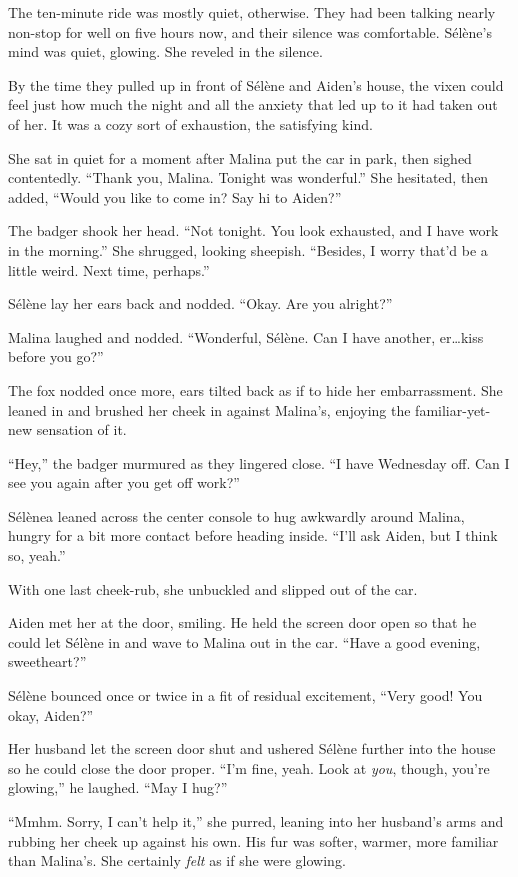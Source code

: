 The ten-minute ride was mostly quiet, otherwise. They had been talking nearly non-stop for well on five hours now, and their silence was comfortable. Sélène's mind was quiet, glowing. She reveled in the silence.

By the time they pulled up in front of Sélène and Aiden's house, the vixen could feel just how much the night and all the anxiety that led up to it had taken out of her. It was a cozy sort of exhaustion, the satisfying kind.

She sat in quiet for a moment after Malina put the car in park, then sighed contentedly. ``Thank you, Malina. Tonight was wonderful.'' She hesitated, then added, ``Would you like to come in? Say hi to Aiden?''

The badger shook her head. ``Not tonight. You look exhausted, and I have work in the morning.'' She shrugged, looking sheepish. ``Besides, I worry that'd be a little weird. Next time, perhaps.''

Sélène lay her ears back and nodded. ``Okay. Are you alright?''

Malina laughed and nodded. ``Wonderful, Sélène. Can I have another, er\ldots{}kiss before you go?''

The fox nodded once more, ears tilted back as if to hide her embarrassment. She leaned in and brushed her cheek in against Malina's, enjoying the familiar-yet-new sensation of it.

``Hey,'' the badger murmured as they lingered close. ``I have Wednesday off. Can I see you again after you get off work?''

Sélènea leaned across the center console to hug awkwardly around Malina, hungry for a bit more contact before heading inside. ``I'll ask Aiden, but I think so, yeah.''

With one last cheek-rub, she unbuckled and slipped out of the car.

Aiden met her at the door, smiling. He held the screen door open so that he could let Sélène in and wave to Malina out in the car. ``Have a good evening, sweetheart?''

Sélène bounced once or twice in a fit of residual excitement, ``Very good! You okay, Aiden?''

Her husband let the screen door shut and ushered Sélène further into the house so he could close the door proper. ``I'm fine, yeah. Look at \emph{you}, though, you're glowing,'' he laughed. ``May I hug?''

``Mmhm. Sorry, I can't help it,'' she purred, leaning into her husband's arms and rubbing her cheek up against his own. His fur was softer, warmer, more familiar than Malina's. She certainly \emph{felt} as if she were glowing.

